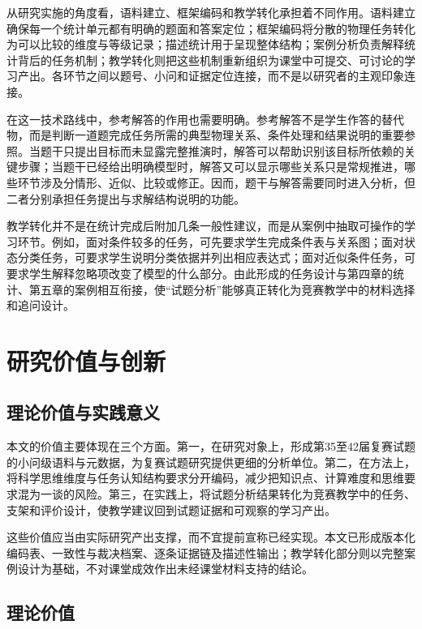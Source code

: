\documentclass[
  12pt,
  a4paper]{ctexbook}
\begin{document}
从研究实施的角度看，语料建立、框架编码和教学转化承担着不同作用。语料建立确保每一个统计单元都有明确的题面和答案定位；框架编码将分散的物理任务转化为可以比较的维度与等级记录；描述统计用于呈现整体结构；案例分析负责解释统计背后的任务机制；教学转化则把这些机制重新组织为课堂中可提交、可讨论的学习产出。各环节之间以题号、小问和证据定位连接，而不是以研究者的主观印象连接。

在这一技术路线中，参考解答的作用也需要明确。参考解答不是学生作答的替代物，而是判断一道题完成任务所需的典型物理关系、条件处理和结果说明的重要参照。当题干只提出目标而未显露完整推演时，解答可以帮助识别该目标所依赖的关键步骤；当题干已经给出明确模型时，解答又可以显示哪些关系只是常规推进，哪些环节涉及分情形、近似、比较或修正。因而，题干与解答需要同时进入分析，但二者分别承担任务提出与求解结构说明的功能。

教学转化并不是在统计完成后附加几条一般性建议，而是从案例中抽取可操作的学习环节。例如，面对条件较多的任务，可先要求学生完成条件表与关系图；面对状态分类任务，可要求学生说明分类依据并列出相应表达式；面对近似条件任务，可要求学生解释忽略项改变了模型的什么部分。由此形成的任务设计与第四章的统计、第五章的案例相互衔接，使``试题分析''能够真正转化为竞赛教学中的材料选择和追问设计。

\section{研究价值与创新}\label{ux7814ux7a76ux4ef7ux503cux4e0eux521bux65b0}

\subsection{理论价值与实践意义}\label{ux7406ux8bbaux4ef7ux503cux4e0eux5b9eux8df5ux610fux4e49}

本文的价值主要体现在三个方面。第一，在研究对象上，形成第35至42届复赛试题的小问级语料与元数据，为复赛试题研究提供更细的分析单位。第二，在方法上，将科学思维维度与任务认知结构要求分开编码，减少把知识点、计算难度和思维要求混为一谈的风险。第三，在实践上，将试题分析结果转化为竞赛教学中的任务、支架和评价设计，使教学建议回到试题证据和可观察的学习产出。

这些价值应当由实际研究产出支撑，而不宜提前宣称已经实现。本文已形成版本化编码表、一致性与裁决档案、逐条证据链及描述性输出；教学转化部分则以完整案例设计为基础，不对课堂成效作出未经课堂材料支持的结论。

\subsection{理论价值}\label{ux7406ux8bbaux4ef7ux503c}
\end{document}
